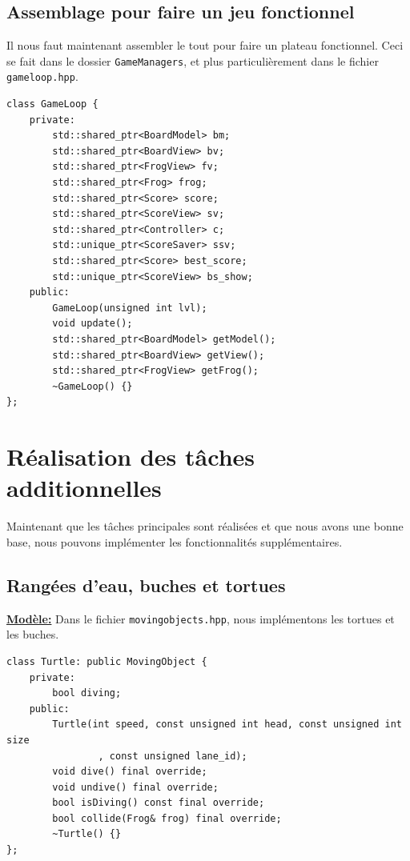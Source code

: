 \documentclass[a4paper, 12pt]{article}
\begin{document}
\subsection{Assemblage pour faire un jeu fonctionnel}

Il nous faut maintenant assembler le tout pour faire un plateau fonctionnel. 
Ceci se fait dans le dossier \texttt{GameManagers}, et plus particulièrement 
dans le fichier \texttt{gameloop.hpp}. 

\begin{lstlisting}
class GameLoop {
    private:
        std::shared_ptr<BoardModel> bm;
        std::shared_ptr<BoardView> bv;
        std::shared_ptr<FrogView> fv;
        std::shared_ptr<Frog> frog;
        std::shared_ptr<Score> score;
        std::shared_ptr<ScoreView> sv;
        std::shared_ptr<Controller> c;
        std::unique_ptr<ScoreSaver> ssv;
        std::shared_ptr<Score> best_score;
        std::unique_ptr<ScoreView> bs_show;
    public:
        GameLoop(unsigned int lvl);
        void update();
        std::shared_ptr<BoardModel> getModel();
        std::shared_ptr<BoardView> getView();
        std::shared_ptr<FrogView> getFrog();
        ~GameLoop() {}
};
\end{lstlisting}

\section{Réalisation des tâches additionnelles}
Maintenant que les tâches principales sont réalisées et que nous avons une bonne base, nous pouvons implémenter les fonctionnalités supplémentaires. 

\subsection{Rangées d'eau, buches et tortues} \label{turtle_class}

\underline{\textbf{Modèle:}} 
Dans le fichier \texttt{movingobjects.hpp}, nous implémentons les tortues et les buches. 

\begin{lstlisting}
class Turtle: public MovingObject {
    private:
        bool diving;
    public:
        Turtle(int speed, const unsigned int head, const unsigned int size
                , const unsigned lane_id);
        void dive() final override;
        void undive() final override;
        bool isDiving() const final override;
        bool collide(Frog& frog) final override;
        ~Turtle() {}
};
\end{lstlisting}
\end{document}
